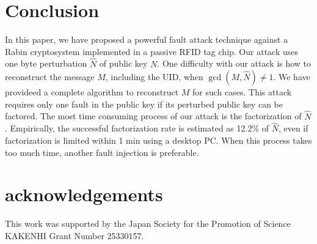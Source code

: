 \documentclass{article}
\begin{document}
\section{Conclusion}
In this paper, we have proposed a powerful fault attack technique against a Rabin cryptosystem implemented in 
a passive RFID tag chip. 
Our attack uses one byte perturbation $\hat{N}$ of public key $N$. 
One difficulty with our attack is how to reconstruct the message $M$, including the UID, when $\gcd(M,\hat{N})\ne 1$.
We have provideed a complete algorithm to reconstruct $M$ for such cases. 
This attack requires only one fault in the public key if its perturbed public key can be factored.
The most time consuming process of our attack is the factorization of $\hat{N}$. 
Empirically, the successful factorization rate is estimated as 12.2\% of $\hat{N}$, 
even if factorization is limited within 1 min using a desktop PC. 
When this process takes too much time, another fault injection is preferable. 


\section*{acknowledgements}
This work was supported by the Japan Society for the Promotion of Science KAKENHI Grant Number 25330157.
\end{document}

